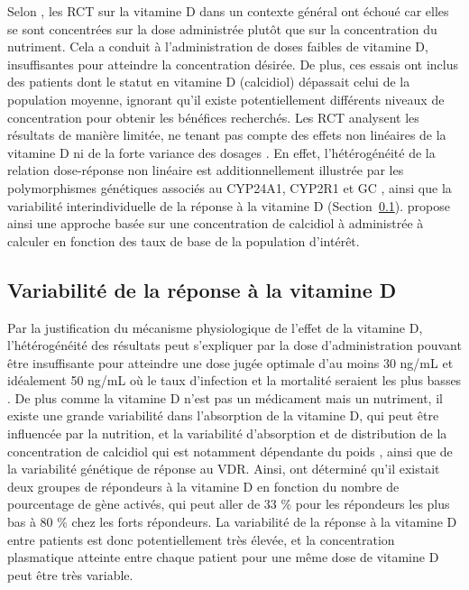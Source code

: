 \documentclass[
  a4paper,
  DIV=11,
  numbers=noendperiod,
  listof=totoc]{scrreprt}
\begin{document}
Selon \textcite{Grant.2022.nutrients.manual}, les \ac{RCT} sur la
vitamine D dans un contexte général ont échoué car elles se sont
concentrées sur la dose administrée plutôt que sur la concentration du
nutriment. Cela a conduit à l'administration de doses faibles de
vitamine D, insuffisantes pour atteindre la concentration désirée. De
plus, ces essais ont inclus des patients dont le statut en vitamine D
(calcidiol) dépassait celui de la population moyenne, ignorant qu'il
existe potentiellement différents niveaux de concentration pour obtenir
les bénéfices recherchés. Les \ac{RCT} analysent les résultats de
manière limitée, ne tenant pas compte des effets non linéaires de la
vitamine D ni de la forte variance des dosages
\autocite{Grant.2022,Grant.2018}. En effet, l'hétérogénéité de la
relation dose-réponse non linéaire est additionnellement illustrée par
les polymorphismes génétiques associés au CYP24A1, CYP2R1 et GC
\autocite{Grant.2018}, ainsi que la variabilité interindividuelle de la
réponse à la vitamine D \autocite{Vukić.2015}
(Section~\ref{sec-variabilite-reponse}). \textcite{Grant.2018} propose
ainsi une approche basée sur une concentration de calcidiol à
administrée à calculer en fonction des taux de base de la population
d'intérêt.

\subsection{Variabilité de la réponse à la vitamine
D}\label{sec-variabilite-reponse}

Par la justification du mécanisme physiologique de l'effet de la
vitamine D, l'hétérogénéité des résultats peut s'expliquer par la dose
d'administration pouvant être insuffisante pour atteindre une dose jugée
optimale d'au moins 30 ng/mL et idéalement 50 ng/mL où le taux
d'infection et la mortalité seraient les plus basses
\autocite{Wimalawansa.2022,Kaufman.2020,Borsche.2021}. De plus comme la
vitamine D n'est pas un médicament mais un nutriment, il existe une
grande variabilité dans l'absorption de la vitamine D, qui peut être
influencée par la nutrition, et la variabilité d'absorption et de
distribution de la concentration de calcidiol qui est notamment
dépendante du poids \autocite{Ekwaru.2014}, ainsi que de la variabilité
génétique de réponse au \ac{VDR}. Ainsi, \textcite{Vukić.2015} ont
déterminé qu'il existait deux groupes de répondeurs à la vitamine D en
fonction du nombre de pourcentage de gène activés, qui peut aller de 33
\% pour les répondeurs les plus bas à 80 \% chez les forts répondeurs.
La variabilité de la réponse à la vitamine D entre patients est donc
potentiellement très élevée, et la concentration plasmatique atteinte
entre chaque patient pour une même dose de vitamine D peut être très
variable.
\end{document}
